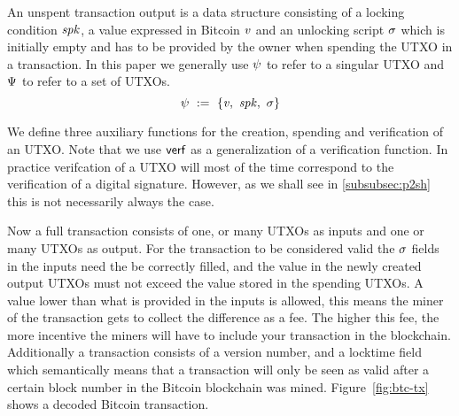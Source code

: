 \begin{definition} An unspent transaction output is a data structure
consisting of a locking condition $\mathit{spk}$, a value expressed in Bitcoin $\mathit{v}$ and an unlocking script $\mathit{\sigma}$ which is
initially empty and has to be provided by the owner when spending the UTXO in a transaction. In this paper we
generally use $\psi$ to refer to a singular UTXO and $\Psi$ to refer to a set of UTXOs.
    \[ \psi ~:=~ \{ \mathit{v} ,~ \mathit{spk} ,~ \mathit{\sigma} \} \]
\end{definition}

We define three auxiliary functions for the creation, spending and verification of an UTXO.
Note that we use $\mathsf{verf}$ as a generalization of a verification function.
In practice verifcation of a UTXO will most of the time correspond to the verification of a digital signature.
However, as we shall see in \ref{subsubsec:p2sh} this is not necessarily always the case.

\begin{center}
    \fbox{
    \begin{varwidth}{\textwidth}
        \procedure[linenumbering]{$\procCreateUTXO{\varValue}{\varScriptPubKey}$} {
        \pcreturn \varUTXO \opAssign \{ \varValue \opAssign \varValue, \varScriptPubKey \opAssign \varScriptPubKey,
        \varScriptSig \opAssign \cnstEmptySet \}
        } \\
        \procedure[linenumbering]{$\procSpendUTXO{\varUTXO}{\varScriptSig}$} {
        \{ \varValue, \varScriptPubKey \} \opFunResult \varUTXO \\
        \pcreturn \varUTXO \opAssign \{ \varValue \opAssign \varValue, \varScriptPubKey \opAssign \varScriptPubKey,
        \varScriptSig \opAssign \varScriptSig \}
        } \\
        \procedure[linenumbering]{$\procVerfUTXO{\varUTXO}$} {
        \{ \varValue, \varScriptPubKey, \varScriptSig \} \opFunResult \varUTXO \\
        \pcreturn \procVerf{\varScriptPubKey}{\varScriptSig}{\varValue}
        }
    \end{varwidth}
    }
\end{center}

Now a full transaction consists of one, or many UTXOs as inputs and one or many UTXOs as output.
For the transaction to be considered valid the $\mathit{\sigma}$ fields in the inputs need the be correctly filled, and the value in the newly created output UTXOs must not exceed the value stored in the spending UTXOs.
A value lower than what is provided in the inputs is allowed, this means the miner of the transaction gets to collect the difference as a fee.
The higher this fee, the more incentive the miners will have to include your transaction in the blockchain.
Additionally a transaction consists of a version number, and a locktime field which semantically means that a
transaction will only be seen as valid after a certain block number in the Bitcoin blockchain was mined.
Figure~\ref{fig:btc-tx} shows a decoded Bitcoin transaction.

